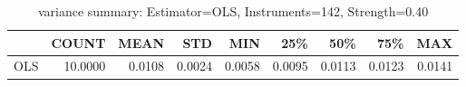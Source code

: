 \begin{table}[ht]
\centering
\caption{variance summary: Estimator=OLS, Instruments=142, Strength=0.40}
\begin{tabular}{lrrrrrrrr}
\toprule
 & COUNT & MEAN & STD & MIN & 25\% & 50\% & 75\% & MAX \\
\midrule
OLS & 10.0000 & 0.0108 & 0.0024 & 0.0058 & 0.0095 & 0.0113 & 0.0123 & 0.0141 \\
\bottomrule
\end{tabular}
\end{table}

